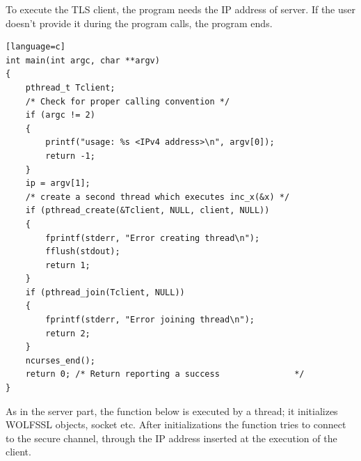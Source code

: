 \documentclass[a4paper,12pt]{article}
\begin{document}
To execute the TLS client, the program needs the IP address of server. If the user doesn't provide it during the program calls, the program ends. 
\begin{lstlisting}[caption={int main() of SSL client},captionpos=b][language=c]
int main(int argc, char **argv)
{
    pthread_t Tclient;
    /* Check for proper calling convention */
    if (argc != 2)
    {
        printf("usage: %s <IPv4 address>\n", argv[0]);
        return -1;
    }
    ip = argv[1];
    /* create a second thread which executes inc_x(&x) */
    if (pthread_create(&Tclient, NULL, client, NULL))
    {
        fprintf(stderr, "Error creating thread\n");
        fflush(stdout);
        return 1;
    }
    if (pthread_join(Tclient, NULL))
    {
        fprintf(stderr, "Error joining thread\n");
        return 2;
    }
    ncurses_end();
    return 0; /* Return reporting a success               */
}
\end{lstlisting}
As in the server part, the function below is executed by a thread; it initializes WOLFSSL objects, socket etc. After initializations the function tries to connect to the secure channel, through the IP address inserted at the execution of the client.
\end{document}
